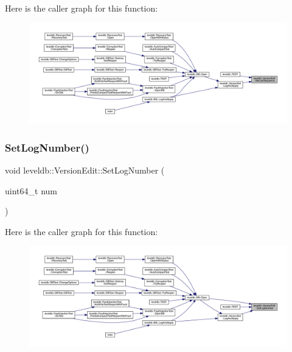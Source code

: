 Here is the caller graph for this function\+:
\nopagebreak
\begin{figure}[H]
\begin{center}
\leavevmode
\includegraphics[width=350pt]{classleveldb_1_1_version_edit_abd6e841ed400672d33d26f4b187a66bf_icgraph}
\end{center}
\end{figure}
\mbox{\label{classleveldb_1_1_version_edit_a47e5c58d34b0e27dc8990687e0c5477a}} 
\subsubsection{\texorpdfstring{SetLogNumber()}{SetLogNumber()}}
{\footnotesize\ttfamily void leveldb\+::\+Version\+Edit\+::\+Set\+Log\+Number (\begin{DoxyParamCaption}\item[{uint64\+\_\+t}]{num }\end{DoxyParamCaption})\hspace{0.3cm}{\ttfamily [inline]}}

Here is the caller graph for this function\+:
\nopagebreak
\begin{figure}[H]
\begin{center}
\leavevmode
\includegraphics[width=350pt]{classleveldb_1_1_version_edit_a47e5c58d34b0e27dc8990687e0c5477a_icgraph}
\end{center}
\end{figure}
\mbox{\label{classleveldb_1_1_version_edit_a4c104515adf573be0ead29e6835f14fb}} 
